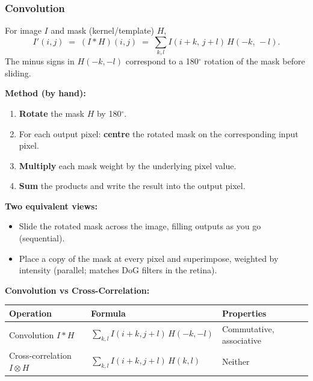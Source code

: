 \subsubsection{Convolution}

\begin{defbox}[2D Convolution]
For image $I$ and mask (kernel/template) $H$,
\[
I'(i,j) \;=\; (I \ast H)(i,j) \;=\; \sum_{k,l} I(i+k,\,j+l)\, H(-k,\,-l).
\]
The minus signs in $H(-k,-l)$ correspond to a 180$^\circ$ rotation of the mask before sliding.
\end{defbox}

\textbf{Method (by hand):}
\begin{enumerate}
  \item \textbf{Rotate} the mask $H$ by 180$^\circ$.
  \item For each output pixel: \textbf{centre} the rotated mask on the corresponding input pixel.
  \item \textbf{Multiply} each mask weight by the underlying pixel value.
  \item \textbf{Sum} the products and write the result into the output pixel.
\end{enumerate}

\textbf{Two equivalent views:}
\begin{itemize}
  \item Slide the rotated mask across the image, filling outputs as you go (sequential).
  \item Place a copy of the mask at every pixel and superimpose, weighted by intensity (parallel; matches DoG filters in the retina).
\end{itemize}

\separator

\textbf{Convolution vs Cross-Correlation:}

\begin{center}
\renewcommand{\arraystretch}{1.3}
\begin{tabular}{@{} l l l @{}}
\toprule
\textbf{Operation} & \textbf{Formula} & \textbf{Properties} \\
\midrule
Convolution $I \ast H$ & $\sum_{k,l} I(i+k,j+l)\, H(-k,-l)$ & Commutative, associative \\
Cross-correlation $I \otimes H$ & $\sum_{k,l} I(i+k,j+l)\, H(k,l)$ & Neither \\
\bottomrule
\end{tabular}
\end{center}

